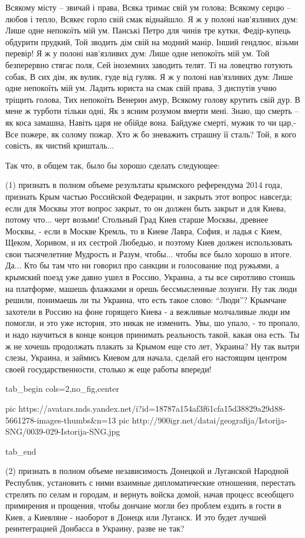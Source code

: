 \raggedcolumns
\begin{multicols}{2} %
\setlength{\parindent}{0pt}
\obeycr
Всякому місту – звичай і права,
Всяка тримає свій ум голова;
Всякому серцю – любов і тепло,
Всякеє горло свій смак віднайшло.
Я ж у полоні нав’язливих дум:
Лише одне непокоїть мій ум.
\smallskip
Панські Петро для чинів тре кутки,
Федір-купець обдурити прудкий,
Той зводить дім свій на модний манір,
Інший гендлює, візьми перевір!
Я ж у полоні нав’язливих дум:
Лише одне непокоїть мій ум.
\smallskip
Той безперервно стягає поля,
Сей іноземних заводить телят.
Ті на ловецтво готують собак,
В сих дім, як вулик, гуде від гуляк.
Я ж у полоні нав’язливих дум:
Лише одне непокоїть мій ум.
\smallskip
Ладить юриста на смак свій права,
З диспутів учню тріщить голова,
Тих непокоїть Венерин амур,
Всякому голову крутить свій дур.
В мене ж турботи тільки одні,
Як з ясним розумом вмерти мені.
\smallskip
Знаю, що смерть – як коса замашна,
Навіть царя не обійде вона.
Байдуже смерті, мужик то чи цар,-
Все пожере, як солому пожар.
Хто ж бо зневажить страшну її сталь?
Той, в кого совість, як чистий кришталь...
\restorecr
\end{multicols} %

Так что, в общем так, было бы хорошо сделать следующее:

(1) признать в полном объеме результаты крымского референдума 2014 года,
признать Крым частью Российской Федерации, и закрыть этот вопрос навсегда; если
для Москвы этот вопрос закрыт, то он должен быть закрыт и для Киева, потому
что...  черт возьми! Стольный Град Киев старше Москвы, древнее Москвы, - если в
Москве Кремль, то в Киеве Лавра, София, и ладья с Кием, Щеком, Хоривом, и их
сестрой Любедью, и поэтому Киев должен использовать свои тысячелетние Мудрость
и Разум, чтобы... чтобы все было хорошо в итоге.  Да... Кто бы там что ни
говорил про санкции и голосование под ружьями, а крымский поезд уже давно ушел
в Россию, Украина, а ты все сиротливо стоишь на платформе, машешь флажками и
орешь бессмысленные лозунги. Ну так люди решили, понимаешь ли ты Украина, что
есть такое слово: \enquote{Люди}? Крымчане захотели в Россию на фоне горящего
Киева - а вежливые молчаливые люди им помогли, и это уже история, это никак не
изменить. Увы, шо упало, - то пропало, и надо научиться в конце концов
принимать реальность такой, какая она есть. Ты ж не хочешь продолжать плакать
за Крымом еще сто лет, Украина? Ну так вытри слезы, Украина, и займись Киевом
для начала, сделай его настоящим центром своей государственности, столько ж еще
работы впереди!

\ifcmt
  tab_begin cols=2,no_fig,center

     pic https://avatars.mds.yandex.net/i?id=18787a154af3f61cfa15d38829a29d88-5661278-images-thumbs&n=13
     pic http://900igr.net/datai/geografija/Istorija-SNG/0039-029-Istorija-SNG.jpg 

  tab_end
\fi

(2) признать в полном объеме независимость Донецкой и Луганской Народной
Республик, установить с ними взаимные дипломатические отношения, перестать
стрелять по селам и городам, и вернуть войска домой, начав процесс всеобщего
примирения и прощения, чтобы дончане могли без проблем ездить в гости в Киев, а
Киевляне - наоборот в Донецк или Луганск. И это будет лучшей реинтеграцией
Донбасса в Украину, разве не так?

